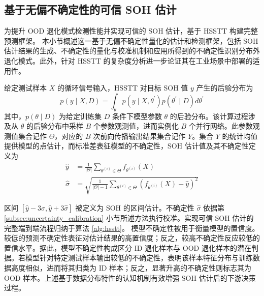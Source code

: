 \subsection{基于无偏不确定性的可信 SOH 估计}\label{subsec:trustworthy_soh_estimation}

为提升 OOD 退化模式检测性能并实现可信的 SOH 估计，基于 HSSTT 构建完整预测框架。
本小节概述这一基于无偏不确定性量化的估计和检测框架，包括 SOH 估计结果的生成、不确定性的量化与校准机制和应用所得到的不确定性识别分布外退化模式。此外，针对 HSSTT 的复杂度分析进一步论证其在工业场景中部署的适用性。

给定测试样本 $X$ 的循环信号输入，HSSTT 对目标 SOH 值 $y$ 产生的后验分布为
% 
\begin{equation}
p(y \mid X,D)=\int_{\theta}p(y \mid X,\theta^{\prime})p(\theta^{\prime} \mid D)d\theta^{\prime}
\label{eq:posterior_distribution}
\end{equation}
%
其中，$p(\theta \mid D)$ 为给定训练集 $D$ 条件下模型参数 $\theta$ 的后验分布。该计算过程涉及从 $\theta$ 的后验分布中采样 $B$ 个参数观测值，进而实例化 $B$ 个并行网络。此参数观测值集合记作 $\Theta$，对应的 $B$ 次前向传播输出结果集合记作 $Y$。集合 $Y$ 的统计均值提供模型的点估计，而标准差表征模型的不确定性，SOH 估计值及其不确定性定义为
% 
\begin{align}
  \label{eq:predictive_mean} \hat{y} & =\frac{1}{|\Theta|}\sum_{\theta^{(i)} \in \Theta}f_{\theta^{(i)}}(X) \\
  \label{eq:predictive_std} \hat{\sigma} & =\sqrt{\frac{1}{|\Theta|-1}\sum_{\theta^{(i)}\in \Theta}(f_{\theta^{(i)}}(X)-\hat{y})^{2}}
\end{align}

区间 $[\hat{y} - 3\hat{\sigma}, \hat{y} + 3\hat{\sigma}]$ 被定义为 SOH 的区间估计。不确定性 $\hat{\sigma}$ 依据第 \ref{subsec:uncertainty_calibration} 小节所述方法执行校准。实现可信 SOH 估计的完整端到端流程归纳于算法 \ref{alg:hsstt}。
% 
模型不确定性被用于衡量模型的置信度。较低的预测不确定性表征对估计结果的高置信度；反之，较高不确定性反应较低的置信水平。据此，模型不确定性构成区分 ID 退化样本与 OOD 退化样本的潜在判据。若模型针对特定测试样本输出较低的不确定性，表明该样本特征分布与训练数据高度相似，进而将其归类为 ID 样本；反之，显著升高的不确定性则标志其为 OOD 样本。上述基于数据分布特性的认知机制有效增强 SOH 估计后的下游决策过程。

